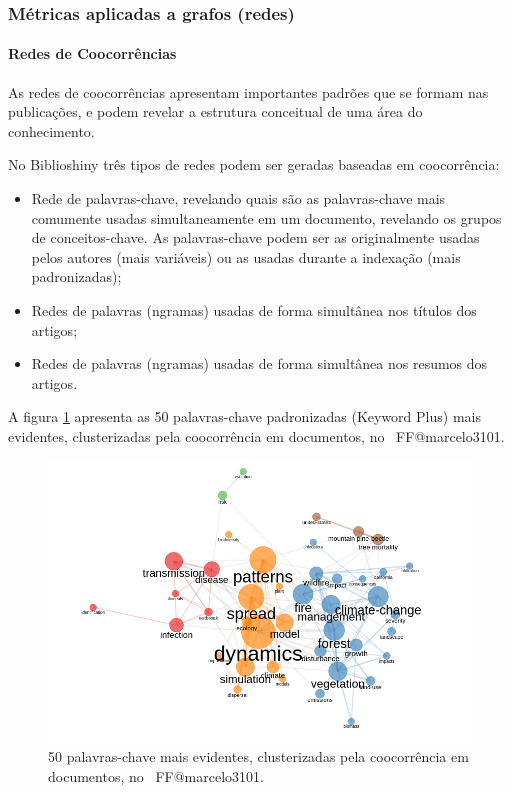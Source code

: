 \subsubsection{Métricas aplicadas a grafos (redes)}

\paragraph{Redes de Coocorrências}

As redes de coocorrências apresentam importantes padrões que se formam nas publicações, e podem revelar a estrutura conceitual de uma área do conhecimento.

No Biblioshiny três tipos de redes podem ser geradas baseadas em coocorrência:
\begin{itemize}
    \item Rede de palavras-chave, revelando quais são as palavras-chave mais comumente usadas simultaneamente em um documento, revelando os grupos de conceitos-chave. As palavras-chave podem ser as originalmente usadas pelos autores (mais variáveis) ou as usadas durante a indexação (mais padronizadas);
    \item Redes de palavras (ngramas) usadas de forma simultânea nos títulos dos artigos;
    \item Redes de palavras (ngramas) usadas de forma simultânea nos resumos dos artigos.
\end{itemize}

A figura \ref{fig:FF@marcelo3101:Co-occurrence-Network} apresenta as 50 palavras-chave padronizadas (Keyword Plus) mais evidentes, clusterizadas pela coocorrência em documentos, no  \dataset\ FF@marcelo3101.

\begin{figure}
    \centering
    \includegraphics[width=1\textwidth]{exploratory-data-analysis/marcelo3101/PesqBibliogr/ForestFire/WoS-20221204/assets/CooccurenceNetwork.png}
    \caption{50 palavras-chave mais evidentes, clusterizadas pela coocorrência em documentos, no  \dataset\ FF@marcelo3101.}
    \label{fig:FF@marcelo3101:Co-occurrence-Network}
\end{figure}

